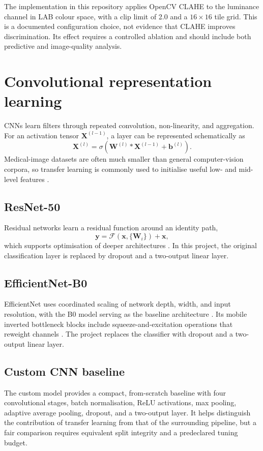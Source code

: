 The implementation in this repository applies OpenCV CLAHE to the luminance channel in LAB colour space, with a clip limit of 2.0 and a $16\times16$ tile grid. This is a documented configuration choice, not evidence that CLAHE improves discrimination. Its effect requires a controlled ablation and should include both predictive and image-quality analysis.

\section{Convolutional representation learning}
CNNs learn filters through repeated convolution, non-linearity, and aggregation. For an activation tensor $\mathbf{X}^{(l-1)}$, a layer can be represented schematically as
\begin{equation}
\mathbf{X}^{(l)}=\sigma\!\left(\mathbf{W}^{(l)}*\mathbf{X}^{(l-1)}+\mathbf{b}^{(l)}\right).
\end{equation}
Medical-image datasets are often much smaller than general computer-vision corpora, so transfer learning is commonly used to initialise useful low- and mid-level features \citep{Litjens2017}.

\subsection{ResNet-50}
Residual networks learn a residual function around an identity path,
\begin{equation}
\mathbf{y}=\mathcal{F}(\mathbf{x},\{\mathbf{W}_i\})+\mathbf{x},
\end{equation}
which supports optimisation of deeper architectures \citep{He2016}. In this project, the original classification layer is replaced by dropout and a two-output linear layer.

\subsection{EfficientNet-B0}
EfficientNet uses coordinated scaling of network depth, width, and input resolution, with the B0 model serving as the baseline architecture \citep{Tan2019}. Its mobile inverted bottleneck blocks include squeeze-and-excitation operations that reweight channels \citep{Hu2018}. The project replaces the classifier with dropout and a two-output linear layer.

\subsection{Custom CNN baseline}
The custom model provides a compact, from-scratch baseline with four convolutional stages, batch normalisation, ReLU activations, max pooling, adaptive average pooling, dropout, and a two-output layer. It helps distinguish the contribution of transfer learning from that of the surrounding pipeline, but a fair comparison requires equivalent split integrity and a predeclared tuning budget.

